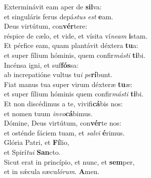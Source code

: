 \evenverse Exterminávit eam aper de \textbf{sil}va:~\*\\
\evenverse et singuláris ferus depá\textit{stus} \textit{est} \textbf{e}am.\\
\oddverse Deus virtútum, con\textbf{vér}tere:~\*\\
\oddverse réspice de cælo, et vide, et vísita ví\textit{ne}\textit{am} \textbf{i}stam.\\
\evenverse Et pérfice eam, quam plantávit déxtera \textbf{tu}a:~\*\\
\evenverse et super fílium hóminis, quem confir\textit{má}\textit{sti} \textbf{ti}bi.\\
\oddverse Incénsa igni, et suf\textbf{fós}sa:~\*\\
\oddverse ab increpatióne vultus tu\textit{i} \textit{pe}\textbf{rí}bunt.\\
\evenverse Fiat manus tua super virum déxteræ \textbf{tu}æ:~\*\\
\evenverse et super fílium hóminis quem confir\textit{má}\textit{sti} \textbf{ti}bi.\\
\oddverse Et non discédimus a te, vivifi\textbf{cá}bis nos:~\*\\
\oddverse et nomen tuum \textit{in}\textit{vo}\textbf{cá}bimus.\\
\evenverse Dómine, Deus virtútum, con\textbf{vér}te nos:~\*\\
\evenverse et osténde fáciem tuam, et \textit{sal}\textit{vi} \textbf{é}rimus.\\
\oddverse Glória Patri, et \textbf{Fí}lio,~\*\\
\oddverse et Spirí\textit{tu}\textit{i} \textbf{San}cto.\\
\evenverse Sicut erat in princípio, et nunc, et \textbf{sem}per,~\*\\
\evenverse et in sǽcula sæcu\textit{ló}\textit{rum}. \textbf{A}men.\\
